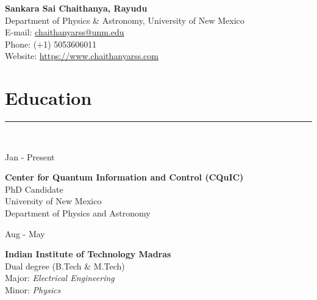 \documentclass[10pt]{article}
\newcommand\vtick{\textquotesingle}
\begin{document}
\begin{center}
    {\bf\Large Sankara Sai Chaithanya, Rayudu} \\
    Department of Physics \& Astronomy, University of New Mexico \\
    E-mail: \href{mailto:chaithanyarss@unm.edu}{chaithanyarss@unm.edu} \\
    Phone: (+1) 5053606011 \\
    Website: \href{https://www.chaithanyarss.com}{https://www.chaithanyarss.com}
\end{center}
\section*{\color{black} Education}
\noindent\textcolor{black}{\rule{\textwidth}{1pt}} \vspace{-0.2cm}\\
\begin{minipage}[t]{.2\textwidth}
Jan\vtick21 - Present
\end{minipage}
\begin{minipage}[t]{.55\textwidth}
{\bf Center for Quantum Information and Control (CQuIC)}\\
PhD Candidate\\
University of New Mexico\\
Department of Physics and Astronomy\\
\end{minipage}
\begin{minipage}[t]{.28\textwidth}
\end{minipage}

\noindent
\begin{minipage}[t]{.2\textwidth}
Aug\vtick14 - May\vtick19
\end{minipage}
\begin{minipage}[t]{.55\textwidth}
{\bf Indian Institute of Technology Madras} \\
Dual degree (B.Tech \& M.Tech) \\
Major: {\it Electrical Engineering} \\
Minor: {\it Physics} \\
\end{minipage}
\begin{minipage}[t]{.28\textwidth}
\end{minipage}
\end{document}

